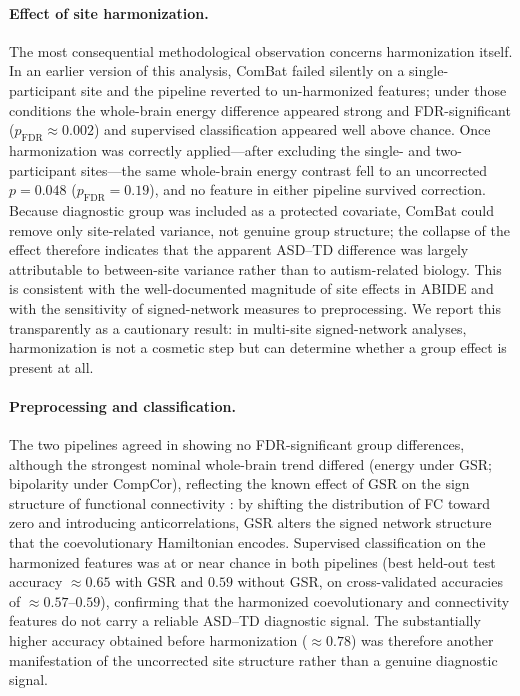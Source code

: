 \documentclass[10pt,letterpaper]{article}
\begin{document}
\paragraph*{Effect of site harmonization.}
The most consequential methodological observation concerns harmonization itself. In an earlier
version of this analysis, ComBat failed silently on a single-participant site and the pipeline
reverted to un-harmonized features; under those conditions the whole-brain energy difference appeared
strong and FDR-significant ($p_{\mathrm{FDR}} \approx 0.002$) and supervised classification appeared
well above chance. Once harmonization was correctly applied---after excluding the single- and
two-participant sites---the same whole-brain energy contrast fell to an uncorrected $p = 0.048$
($p_{\mathrm{FDR}} = 0.19$), and no feature in either pipeline survived correction. Because diagnostic
group was included as a protected covariate, ComBat could remove only site-related variance, not
genuine group structure; the collapse of the effect therefore indicates that the apparent ASD--TD
difference was largely attributable to between-site variance rather than to autism-related biology.
This is consistent with the well-documented magnitude of site effects in ABIDE and with the
sensitivity of signed-network measures to preprocessing. We report this transparently as a cautionary
result: in multi-site signed-network analyses, harmonization is not a cosmetic step but can determine
whether a group effect is present at all.

\paragraph*{Preprocessing and classification.}
The two pipelines agreed in showing no FDR-significant group differences, although the strongest
nominal whole-brain trend differed (energy under GSR; bipolarity under CompCor), reflecting the known
effect of GSR on the sign structure of functional connectivity \cite{Murphy2009,Fox2009,Chang2009}:
by shifting the distribution of FC toward zero and introducing anticorrelations, GSR alters the
signed network structure that the coevolutionary Hamiltonian encodes. Supervised classification on
the harmonized features was at or near chance in both pipelines (best held-out test accuracy
$\approx 0.65$ with GSR and $0.59$ without GSR, on cross-validated accuracies of $\approx 0.57$--$0.59$),
confirming that the harmonized coevolutionary and connectivity features do not carry a reliable
ASD--TD diagnostic signal. The substantially higher accuracy obtained before harmonization
($\approx 0.78$) was therefore another manifestation of the uncorrected site structure rather than a
genuine diagnostic signal.
\end{document}
